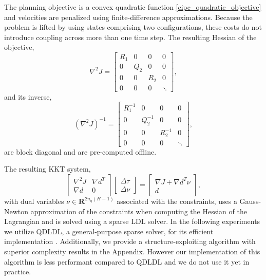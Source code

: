 The planning objective is a convex quadratic function \eqref{cipc_quadratic_objective} and velocities are penalized using finite-difference approximations. Because the problem is lifted by using states comprising two configurations, these costs do not introduce coupling across more than one time step. The resulting Hessian of the objective,
\begin{equation}
	\nabla^2 J = \begin{bmatrix} R_1 & 0 & 0 & 0 \\ 0 & Q_2 & 0 & 0 \\ 0 & 0 & R_2 & 0 \\ 0 & 0 & 0 & \ddots \end{bmatrix},
\end{equation}
and its inverse,
\begin{equation}
	(\nabla^2 J)^{-1} = \begin{bmatrix} R^{-1}_1 & 0 & 0 & 0 \\ 0 & Q^{-1}_2 & 0 & 0 \\ 0 & 0 & R^{-1}_2 & 0 \\ 0 & 0 & 0 & \ddots \end{bmatrix},
\end{equation}
are block diagonal and are pre-computed offline.

The resulting KKT system,
\begin{equation}
	\begin{bmatrix} \nabla^2 J & \nabla d^T \\ \nabla d & 0 \end{bmatrix} \begin{bmatrix} \Delta \tau \\ \Delta \nu \end{bmatrix} = \begin{bmatrix} \nabla J + \nabla d^T \nu \\ d \end{bmatrix}, \label{cipc_trajopt_kkt}
\end{equation}
with dual variables $\nu \in \mathbf{R}^{2 n_q (H-1)}$ associated with the constraints, uses a Gauss-Newton approximation of the constraints when computing the Hessian of the Lagrangian and is solved using a sparse $\mbox{LDL}$ solver. In the following experiments we utilize QDLDL, a general-purpose sparse solver, for its efficient implementation \cite{davis2005algorithm}. Additionally, we provide a structure-exploiting algorithm with superior complexity results in the Appendix. However our implementation of this algorithm is less performant compared to QDLDL and we do not use it yet in practice.

